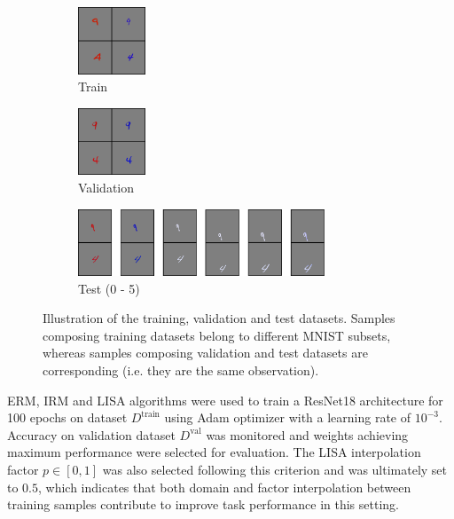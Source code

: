 \begin{figure}[H]
    \centering
    \begin{subfigure}[b]{0.2\textwidth}
        \centering
        \includegraphics[height=2cm]{img/results_discussion/datashift/dsimages/train_collage.png}
        \caption*{Train}
    \end{subfigure}%
    \hfill
    \begin{subfigure}[b]{0.2\textwidth}
        \centering
        \includegraphics[height=2cm]{img/results_discussion/datashift/dsimages/val_collage.png}
        \caption*{Validation}
    \end{subfigure}%
    \hfill
    \begin{subfigure}[b]{0.6\textwidth}
        \centering
        \includegraphics[height=2cm]{img/results_discussion/datashift/dsimages/test_collage2.png}
        \caption*{Test (0 - 5)}
    \end{subfigure}
    \caption{
    Illustration of the training, validation and test datasets. 
    Samples composing training datasets belong to different MNIST subsets, whereas samples composing
    validation and test datasets are corresponding (i.e. they are the same observation).
    }
    \label{fig:data_shift_images}
\end{figure}

ERM, IRM \cite{arjovskyInvariantRiskMinimization2020} and
LISA \cite{yaoImprovingOutofDistributionRobustness2022} algorithms were used to train a ResNet18 architecture
for 100 epochs on dataset $D^{\text{train}}$ using Adam \cite{kingmaAdamMethodStochastic2017}
optimizer with a learning rate 
of $10^{-3}$. Accuracy on validation dataset $D^{\text{val}}$ was monitored and weights
achieving maximum performance were selected for evaluation. The LISA interpolation
factor $p \in [0,1]$ was also selected following this criterion and was ultimately set to $0.5$, 
which indicates that both domain and factor interpolation between training samples
contribute to improve task performance in this setting. \\

